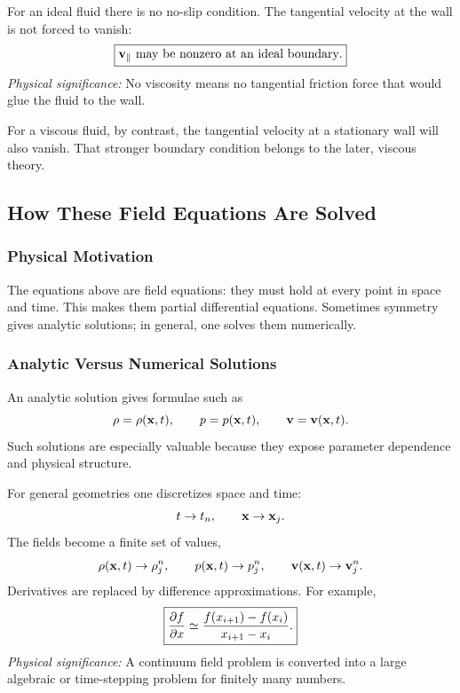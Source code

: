 \documentclass[../main.tex]{subfiles}
\begin{document}
For an ideal fluid there is no no-slip condition. The tangential velocity at the wall is not forced to vanish:
\begin{equation}
  \boxed{\mathbf{v}_{\parallel}\ \text{may be nonzero at an ideal boundary}.}
  \label{eq:lec12_tangential_velocity_ideal}
\end{equation}
\textit{Physical significance:} No viscosity means no tangential friction force that would glue the fluid to the wall.

For a viscous fluid, by contrast, the tangential velocity at a stationary wall will also vanish. That stronger boundary condition belongs to the later, viscous theory.

\subsection{How These Field Equations Are Solved}\label{sec:lec12:solving-field-equations}

\subsubsection*{Physical Motivation}
The equations above are field equations: they must hold at every point in space and time. This makes them partial differential equations. Sometimes symmetry gives analytic solutions; in general, one solves them numerically.

\subsubsection{Analytic Versus Numerical Solutions}\label{subsec:lec12:analytic-numerical}
An analytic solution gives formulae such as
\begin{equation}
  \rho=\rho(\mathbf{x},t),\qquad
  p=p(\mathbf{x},t),\qquad
  \mathbf{v}=\mathbf{v}(\mathbf{x},t).
  \label{eq:lec12_analytic_solution_form}
\end{equation}
Such solutions are especially valuable because they expose parameter dependence and physical structure.

For general geometries one discretizes space and time:
\begin{equation}
  t\rightarrow t_n,\qquad
  \mathbf{x}\rightarrow \mathbf{x}_j.
  \label{eq:lec12_discretization_grid}
\end{equation}
The fields become a finite set of values,
\begin{equation}
  \rho(\mathbf{x},t)\rightarrow \rho_j^n,\qquad
  p(\mathbf{x},t)\rightarrow p_j^n,\qquad
  \mathbf{v}(\mathbf{x},t)\rightarrow \mathbf{v}_j^n.
  \label{eq:lec12_discrete_fields}
\end{equation}
Derivatives are replaced by difference approximations. For example,
\begin{equation}
  \boxed{
  \pdv{f}{x}(x_i)
  \simeq
  \frac{f(x_{i+1})-f(x_i)}{x_{i+1}-x_i}.}
  \label{eq:lec12_finite_difference_example}
\end{equation}
\textit{Physical significance:} A continuum field problem is converted into a large algebraic or time-stepping problem for finitely many numbers.
\end{document}
